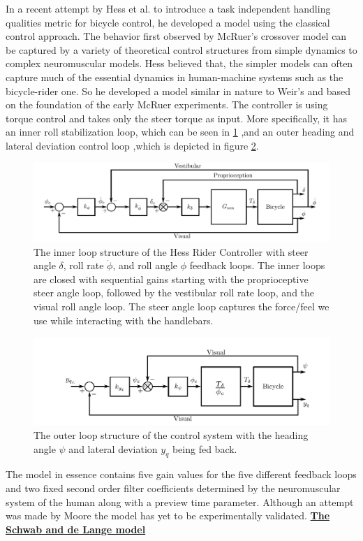 In a recent attempt by Hess et al. to introduce a task independent handling qualities metric for bicycle control, he developed a model using the classical control approach. The behavior first observed by McRuer’s crossover model  can be captured by a variety of theoretical control structures from simple dynamics to complex neuromuscular models\cite{hess1984effects}. Hess believed that, the simpler models can often capture much of the essential dynamics in human-machine systems such as the bicycle-rider one. So he developed a model similar in nature to Weir’s and based on the foundation of the early McRuer experiments. The controller is using torque control and takes only the steer torque as input. More specifically, it has an inner roll stabilization loop, which can be seen in \ref{fig:figure7} ,and an outer heading and lateral deviation control  loop ,which is depicted in figure \ref{fig:figure8}.
\begin{figure}[ht]
    \centering
    \includegraphics[scale=0.4]{images/hess_roll.png}
    \caption{The inner loop structure of the Hess Rider Controller with steer angle \ensuremath{\delta}, roll rate \ensuremath{\dot{\phi}}, and roll angle \ensuremath{\phi} feedback loops. The inner loops are closed with sequential gains starting with the proprioceptive steer angle loop, followed by the vestibular roll rate loop, and the visual roll angle loop. The steer angle loop captures the force/feel  we use while interacting with the handlebars.\cite{moore2012human}}
    \label{fig:figure7}
\end{figure}
\begin{figure}[ht]
    \centering
    \includegraphics[scale=0.45]{images/hess_lat.png}
    \caption{The outer loop structure of the control system with the heading angle \ensuremath{\psi} and lateral deviation \ensuremath{y_q} being fed back.\cite{moore2012human}}
    \label{fig:figure8}
\end{figure}
\par
The model in essence contains five gain values for the five different feedback loops and two fixed second order filter coefficients determined by the neuromuscular system of the human along with a preview time parameter.  Although an attempt was made by Moore \cite{moore2012human} the model has yet to be experimentally validated.
\bigbreak
\underline{\textbf{The Schwab and de Lange model \cite{schwab2013}}}
\newline

